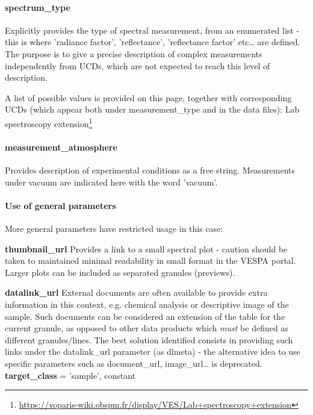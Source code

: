 \documentclass[11pt,a4paper]{ivoa}
\begin{document}
\paragraph{spectrum\_type}

Explicitly provides the type of spectral measurement, from an enumerated list - this is where 'radiance factor', 'reflectance', 'reflectance factor' etc… are defined. The purpose is to give a precise description of complex measurements independently from UCDs, which are not expected to reach this level of description.

A list of possible values is provided on this page, together with corresponding UCDs (which appear both under measurement\_type and in the data files): Lab spectroscopy extension\footnote{\url{https://voparis-wiki.obspm.fr/display/VES/Lab+spectroscopy+extension}}

\paragraph{measurement\_atmosphere}

Provides description of experimental conditions as a free string. Measurements under vacuum are indicated here with the word 'vacuum'.

\paragraph{Use of general parameters\textbf{ }}

More general parameters have restricted usage in this case:

\textbf{thumbnail\_url }Provides a link to a small spectral plot - caution should be taken to maintained minimal readability in small format in the VESPA portal. Larger plots can be included as separated granules (previews).

\textbf{datalink\_url} External documents are often available to provide extra information in this context, e.g. chemical analysis or descriptive image of the sample. Such documents can be considered an extension of the table for the current granule, as opposed to other data products which \emph{must} be defined as different granules/lines. The best solution identified consists in providing such links under the datalink\_url parameter (as dlmeta)  - the alternative idea to use specific parameters such as document\_url, image\_url… is deprecated.\\

\textbf{target\_class }= 'sample', constant
\end{document}
